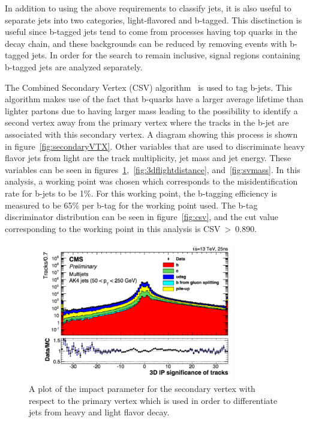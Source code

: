 In addition to using the above requirements to classify jets, it is also useful to separate jets into two categories, light-flavored and b-tagged.
This disctinction is useful since b-tagged jets tend to come from processes having top quarks in the decay chain,
and these backgrounds can be reduced by removing events with b-tagged jets.
In order for the search to remain inclusive, signal regions containing b-tagged jets are analyzed separately.

The Combined Secondary Vertex (CSV) algorithm~\cite{btagging}\cite{btagging2015} is used to tag b-jets.
This algorithm makes use of the fact that b-quarks have a larger average lifetime than lighter partons due to having larger mass
leading to the possibility to identify a second vertex away from the primary vertex where the tracks in the b-jet are associated with this secondary vertex.
A diagram showing this process is shown in figure~\ref{fig:secondaryVTX}.
Other variables that are used to discriminate heavy flavor jets from light are the track multiplicity, jet mass and jet energy.
These variables can be seen in figures~\ref{fig:3dip},~\ref{fig:3dflightdistance}, and~\ref{fig:svmass}.
In this analysis, a working point was chosen which corresponds to the misidentification rate for b-jets to be 1\%.
For this working point, the b-tagging efficiency is measured to be 65\% per b-tag for the working point used. 
The b-tag discriminator distribution can be seen in figure~\ref{fig:csv},
and the cut value corresponding to the working point in this analysis is CSV$~>~$0.890.

\begin{figure}[!ht]
  \begin{center}
      \includegraphics[width=0.8\textwidth]{evtsel/figs/CMS-PAS-BTV-15-001_Figure_001-a.pdf}
    \caption{
      \label{fig:3dip}
      A plot of the impact parameter for the secondary vertex with respect to the primary vertex
      which is used in order to differentiate jets from heavy and light flavor decay.
    }
  \end{center}
\end{figure}


